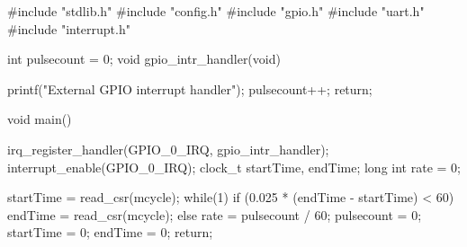#include "stdlib.h"
#include "config.h"
#include "gpio.h"
#include "uart.h"
#include "interrupt.h"

 int pulsecount = 0;
void gpio_intr_handler(void) {
 
	printf("External GPIO interrupt handler\n");
     	pulsecount++;
         return;
}

void main() 
{
    irq_register_handler(GPIO_0_IRQ, gpio_intr_handler);
    interrupt_enable(GPIO_0_IRQ);
    clock_t startTime, endTime;
    long int rate = 0;

    startTime = read_csr(mcycle);
    while(1) {
	if (0.025 * (endTime - startTime) < 60) {
	    endTime = read_csr(mcycle);
	} else {
	    rate = pulsecount / 60;
	    pulsecount = 0;
	    startTime = 0;
	    endTime = 0;
	}
    }
    return;
}
